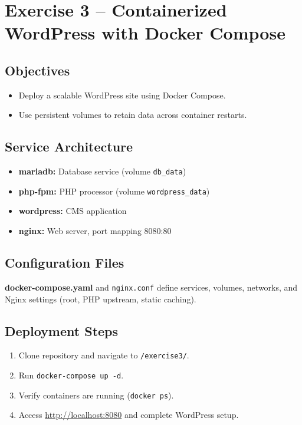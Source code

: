 \documentclass[11pt,a4paper]{article}
\begin{document}
\section{Exercise 3 – Containerized WordPress with Docker Compose}
\subsection{Objectives}
\begin{itemize}
  \item Deploy a scalable WordPress site using Docker Compose.
  \item Use persistent volumes to retain data across container restarts.
\end{itemize}

\subsection{Service Architecture}
\begin{itemize}
  \item \textbf{mariadb:} Database service (volume \texttt{db\_data})
  \item \textbf{php-fpm:} PHP processor (volume \texttt{wordpress\_data})
  \item \textbf{wordpress:} CMS application
  \item \textbf{nginx:} Web server, port mapping 8080:80
\end{itemize}

\subsection{Configuration Files}
\textbf{docker-compose.yaml} and \texttt{nginx.conf} define services, volumes, networks, and Nginx settings (root, PHP upstream, static caching).

\subsection{Deployment Steps}
\begin{enumerate}
  \item Clone repository and navigate to \texttt{/exercise3/}.
  \item Run \texttt{docker-compose up -d}.
  \item Verify containers are running (\texttt{docker ps}).
  \item Access \url{http://localhost:8080} and complete WordPress setup.
\end{enumerate}
\end{document}
